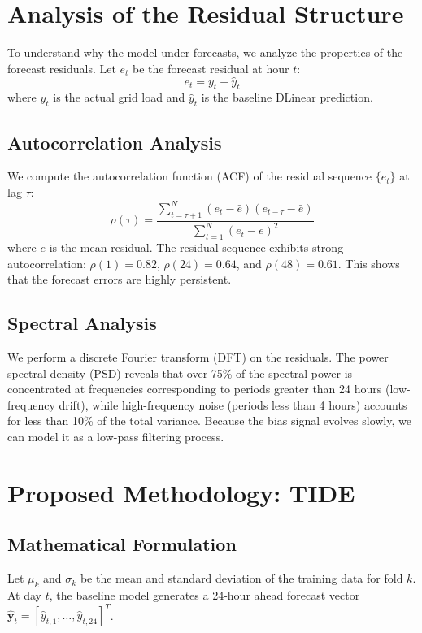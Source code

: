 \documentclass[journal]{IEEEtran}
\begin{document}
\section{Analysis of the Residual Structure}
To understand why the model under-forecasts, we analyze the properties of the forecast residuals. Let $e_t$ be the forecast residual at hour $t$:
\begin{equation}
e_t = y_t - \hat{y}_t
\end{equation}
where $y_t$ is the actual grid load and $\hat{y}_t$ is the baseline DLinear prediction.

\subsection{Autocorrelation Analysis}
We compute the autocorrelation function (ACF) of the residual sequence $\{e_t\}$ at lag $\tau$:
\begin{equation}
\rho(\tau) = \frac{\sum_{t=\tau+1}^{N} (e_t - \bar{e})(e_{t-\tau} - \bar{e})}{\sum_{t=1}^{N} (e_t - \bar{e})^2}
\end{equation}
where $\bar{e}$ is the mean residual. The residual sequence exhibits strong autocorrelation: $\rho(1) = 0.82$, $\rho(24) = 0.64$, and $\rho(48) = 0.61$. This shows that the forecast errors are highly persistent.

\subsection{Spectral Analysis}
We perform a discrete Fourier transform (DFT) on the residuals. The power spectral density (PSD) reveals that over 75\% of the spectral power is concentrated at frequencies corresponding to periods greater than 24 hours (low-frequency drift), while high-frequency noise (periods less than 4 hours) accounts for less than 10\% of the total variance. Because the bias signal evolves slowly, we can model it as a low-pass filtering process.

\section{Proposed Methodology: TIDE}

\subsection{Mathematical Formulation}
Let $\mu_k$ and $\sigma_k$ be the mean and standard deviation of the training data for fold $k$. At day $t$, the baseline model generates a 24-hour ahead forecast vector $\hat{\mathbf{y}}_t = [\hat{y}_{t,1}, \dots, \hat{y}_{t,24}]^T$.
\end{document}
